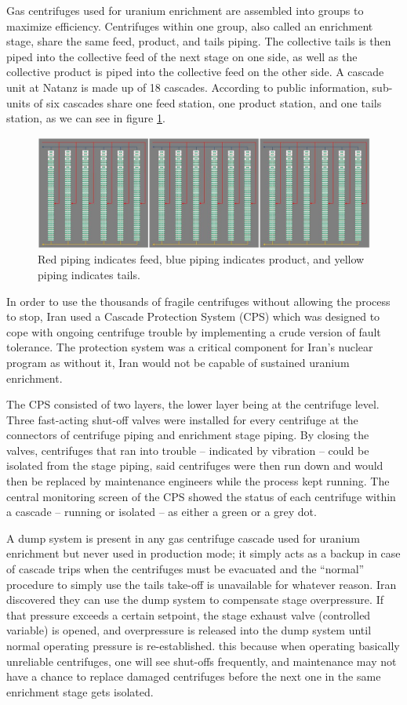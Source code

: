 \documentclass[12pt]{article}
\begin{document}
Gas centrifuges used for uranium enrichment are assembled into groups to maximize efficiency. Centrifuges within one group, also called an enrichment stage, share the same feed, product, and tails piping.
The collective tails is then piped into the collective feed of the next stage on one side, as well as the collective product is piped into the collective feed on the other side.
A cascade unit at Natanz is made up of 18 cascades. According to public information, sub-units of six cascades share one feed station, one product station, and one tails station, as we can see in figure \ref{fig:cascade}.
    \begin{figure}[H]
    \centering
    \includegraphics[height=0.33\textwidth]{cascade.png}
    \caption{Red piping indicates feed, blue piping indicates product, and yellow piping indicates tails.}
    \label{fig:cascade}
    \end{figure}
    
In order to use the thousands of fragile centrifuges without allowing the process to stop, Iran used a Cascade Protection System (CPS) which was designed to cope with ongoing centrifuge trouble by implementing a crude version of fault tolerance. The protection system was a critical component for Iran’s nuclear program as without it, Iran would not be capable of sustained uranium enrichment.

The CPS consisted of two layers, the lower layer being at the centrifuge level. Three fast-acting shut-off valves were installed for every centrifuge at the connectors of centrifuge piping and enrichment stage piping. By closing the valves, centrifuges that ran into trouble – indicated by vibration – could be isolated from the stage piping, said centrifuges were then run down and would then be replaced by maintenance engineers while the process kept running. The central monitoring screen of the CPS showed the status of each centrifuge within a cascade – running or isolated – as either a green or a grey dot.

 A dump system is present in any gas centrifuge cascade used for uranium enrichment but never used in production mode; it simply acts as a backup in case of cascade trips when the centrifuges must be evacuated and the “normal” procedure to simply use the tails take-off is unavailable for whatever reason. Iran discovered they can use the dump system to compensate stage overpressure. If that pressure exceeds a certain setpoint, the stage exhaust valve (controlled variable) is opened, and overpressure is released into the dump system until normal operating pressure is re-established.
this because when operating basically unreliable centrifuges, one will see shut-offs frequently, and maintenance may not have a chance to replace damaged centrifuges before the next one in the same enrichment stage gets isolated.
\end{document}
